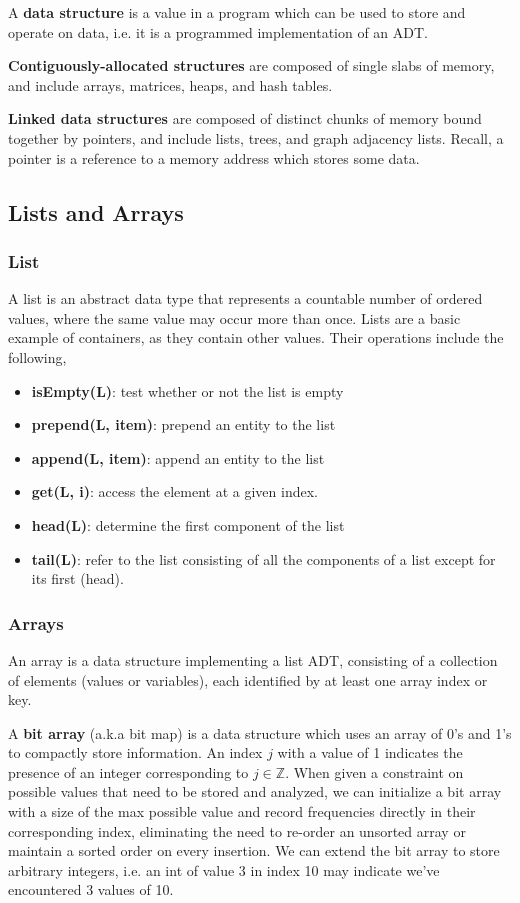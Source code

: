 \documentclass{article}
\begin{document}
    A \textbf{data structure} is a value in a program which can be used to store and operate on data, i.e. it is a programmed implementation of an ADT.
    
    \textbf{Contiguously-allocated structures} are composed of single slabs of memory, and include arrays, matrices, heaps, and hash tables.
     
    \textbf{Linked data structures} are composed of distinct chunks of memory bound together by pointers, and include lists, trees, and graph adjacency lists. Recall, a pointer is a reference to a memory address which stores some data.

    \subsection{Lists and Arrays}
    \subsubsection{List}
    A list is an abstract data type that represents a countable number of ordered values, where the same value may occur more than once. Lists are a basic example of containers, as they contain other values. Their operations include the following,
    \begin{itemize}
        \item \textbf{isEmpty(L)}: test whether or not the list is empty
        \item \textbf{prepend(L, item)}: prepend an entity to the list
        \item \textbf{append(L, item)}: append an entity to the list
        \item \textbf{get(L, i)}: access the element at a given index.
        \item \textbf{head(L)}: determine the first component of the list
        \item \textbf{tail(L)}: refer to the list consisting of all the components of a list except for its first (head).
    \end{itemize}
    
    \subsubsection{Arrays}
    An array is a data structure implementing a list ADT, consisting of a collection of elements (values or variables), each identified by at least one array index or key. 
    
    A \textbf{bit array} (a.k.a bit map) is a data structure which uses an array of 0's and 1's to compactly store information. An index $j$ with a value of 1 indicates the presence of an integer corresponding to $j \in \mathbb Z$. When given a constraint on possible values that need to be stored and analyzed, we can initialize a bit array with a size of the max possible value and record frequencies directly in their corresponding index, eliminating the need to re-order an unsorted array or maintain a sorted order on every insertion. We can extend the bit array to store arbitrary integers, i.e. an int of value 3 in index 10 may indicate we've encountered 3 values of 10. 
    
\end{document}
